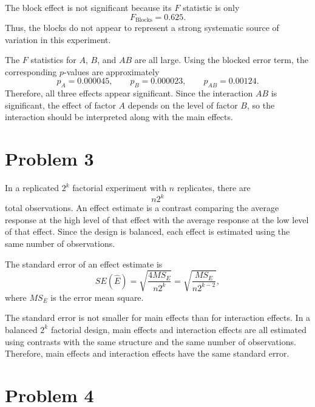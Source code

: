 \documentclass[answers,12pt,addpoints]{exam}
\begin{document}
\begin{solution}
The block effect is not significant because its $F$ statistic is only
\[
F_{\text{Blocks}}=0.625.
\]
Thus, the blocks do not appear to represent a strong systematic source of variation in this experiment.

The $F$ statistics for $A$, $B$, and $AB$ are all large. Using the blocked error term, the corresponding $p$-values are approximately
\[
p_A=0.000045,\qquad p_B=0.000023,\qquad p_{AB}=0.00124.
\]
Therefore, all three effects appear significant. Since the interaction $AB$ is significant, the effect of factor $A$ depends on the level of factor $B$, so the interaction should be interpreted along with the main effects.


\end{solution}

\section{Problem 3}

\begin{solution}
In a replicated $2^k$ factorial experiment with $n$ replicates, there are
\[
n2^k
\]
total observations. An effect estimate is a contrast comparing the average response at the high level of that effect with the average response at the low level of that effect. Since the design is balanced, each effect is estimated using the same number of observations.

The standard error of an effect estimate is
\[
SE(\hat{E})
=
\sqrt{\frac{4MS_E}{n2^k}}
=
\sqrt{\frac{MS_E}{n2^{k-2}}},
\]
where $MS_E$ is the error mean square.

The standard error is not smaller for main effects than for interaction effects. In a balanced $2^k$ factorial design, main effects and interaction effects are all estimated using contrasts with the same structure and the same number of observations. Therefore, main effects and interaction effects have the same standard error.
\end{solution}

\section{Problem 4}
\end{document}
